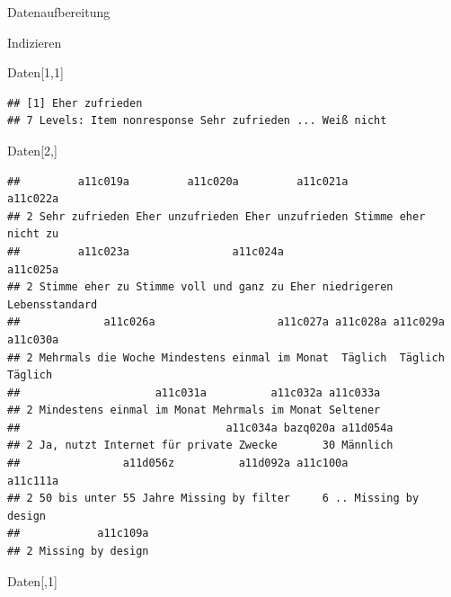 \documentclass[ignorenonframetext,]{beamer}
\newenvironment{Shaded}{}{}
\newcommand{\DecValTok}[1]{\textcolor[rgb]{0.25,0.63,0.44}{{#1}}}
\newcommand{\NormalTok}[1]{{#1}}
\begin{document}
\begin{frame}[fragile]{Datenaufbereitung}
\begin{block}{Indizieren}
\begin{Shaded}
\begin{Highlighting}[]
\NormalTok{Daten[}\DecValTok{1}\NormalTok{,}\DecValTok{1}\NormalTok{]}
\end{Highlighting}
\end{Shaded}

\begin{verbatim}
## [1] Eher zufrieden
## 7 Levels: Item nonresponse Sehr zufrieden ... Weiß nicht
\end{verbatim}

\begin{Shaded}
\begin{Highlighting}[]
\NormalTok{Daten[}\DecValTok{2}\NormalTok{,]}
\end{Highlighting}
\end{Shaded}

\begin{verbatim}
##         a11c019a         a11c020a         a11c021a             a11c022a
## 2 Sehr zufrieden Eher unzufrieden Eher unzufrieden Stimme eher nicht zu
##         a11c023a                a11c024a                        a11c025a
## 2 Stimme eher zu Stimme voll und ganz zu Eher niedrigeren Lebensstandard
##             a11c026a                   a11c027a a11c028a a11c029a a11c030a
## 2 Mehrmals die Woche Mindestens einmal im Monat  Täglich  Täglich  Täglich
##                     a11c031a          a11c032a a11c033a
## 2 Mindestens einmal im Monat Mehrmals im Monat Seltener
##                                a11c034a bazq020a a11d054a
## 2 Ja, nutzt Internet für private Zwecke       30 Männlich
##                a11d056z          a11d092a a11c100a          a11c111a
## 2 50 bis unter 55 Jahre Missing by filter     6 .. Missing by design
##            a11c109a
## 2 Missing by design
\end{verbatim}

\begin{Shaded}
\begin{Highlighting}[]
\NormalTok{Daten[,}\DecValTok{1}\NormalTok{]}
\end{Highlighting}
\end{Shaded}


\end{block}
\end{frame}
\end{document}
